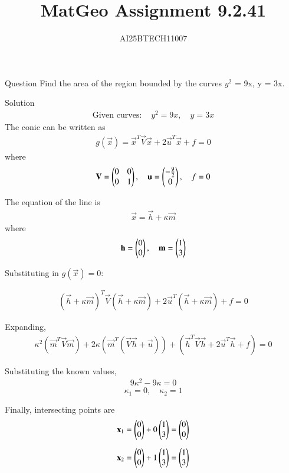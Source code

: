 \documentclass{beamer}
\title 
{MatGeo Assignment 9.2.41}
\author
{AI25BTECH11007}
\begin{document}
\frame{\titlepage}
\begin{frame}{Question}
     Find the area of the region bounded by the curves $y^2$ = 9x, y = 3x.
\end{frame}

\begin{frame}{Solution}
    \begin{align}
  \text{Given curves: } 
  & y^2 = 9x, \quad y = 3x
\end{align}
The conic can be written as
\begin{align}
g(\vec{x}) = \vec{x}^T\vec{V}\vec{x} + 2\vec{u}^T\vec{x} + f = 0
\end{align}
where
\begin{align}
\mathbf{V} = \begin{pmatrix}0 & 0 \\ 0 & 1\end{pmatrix}, \quad
\mathbf{u} = \begin{pmatrix}-\tfrac{9}{2} \\ 0\end{pmatrix}, \quad
f = 0
\end{align}

The equation of the line is
\begin{align}
\vec{x} = \vec{h} + \kappa \vec{m}
\end{align}
where
\begin{align}
\mathbf{h} = \begin{pmatrix}0 \\ 0\end{pmatrix}, \quad 
\mathbf{m} = \begin{pmatrix}1 \\ 3\end{pmatrix}
\end{align}

Substituting in $g(\vec{x}) = 0$:
\end{frame}

\begin{frame}
    \begin{align}
(\vec{h} + \kappa\vec{m})^T\vec{V}(\vec{h} + \kappa\vec{m})
+ 2\vec{u}^T(\vec{h} + \kappa\vec{m}) + f = 0
\end{align}

Expanding,
\begin{align}
\kappa^2 (\vec{m}^T\vec{V}\vec{m}) + 2\kappa(\vec{m}^T(\vec{V}\vec{h} + \vec{u})) + (\vec{h}^T\vec{V}\vec{h} + 2\vec{u}^T\vec{h} + f) = 0
\end{align}

Substituting the known values,
\begin{align}
9\kappa^2 - 9\kappa = 0
\end{align}
\[
\kappa_1 = 0, \quad \kappa_2 = 1
\]

\noindent
Finally, intersecting points are
\begin{align}
\mathbf{x}_1 &= \begin{pmatrix}0 \\ 0\end{pmatrix} + 0\begin{pmatrix}1 \\ 3\end{pmatrix} = \begin{pmatrix}0 \\ 0\end{pmatrix} \\[2mm]
\mathbf{x}_2 &= \begin{pmatrix}0 \\ 0\end{pmatrix} + 1\begin{pmatrix}1 \\ 3\end{pmatrix} = \begin{pmatrix}1 \\ 3\end{pmatrix}
\end{align}
\end{frame}
\end{document}
